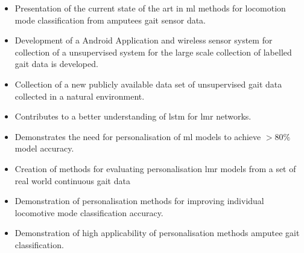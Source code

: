 \begin{itemize}
    \item Presentation of the current state of the art in {\acrshort{ml}} methods for locomotion mode classification from amputees gait sensor data.
    \item Development of a Android Application and wireless sensor system for collection of a unsupervised system for the large scale collection of labelled gait data is developed.
    \item Collection of a new publicly available data set of unsupervised gait data collected in a natural environment.
    \item Contributes to a better understanding of \acrlong{lstm} for \acrshort{lmr} networks.
    \item Demonstrates the need for personalisation of {\acrshort{ml}} models to achieve $> 80\%$ model accuracy.
    \item Creation of methods for evaluating personalisation \acrshort{lmr} models from a set of real world continuous gait data
    \item Demonstration of personalisation methods for improving individual locomotive mode classification accuracy.
    \item Demonstration of high applicability of personalisation methods amputee gait classification.
\end{itemize}
